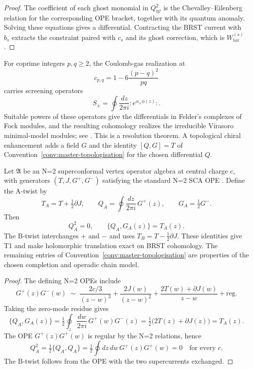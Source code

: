 \begin{proof}
The coefficient of each ghost monomial in $Q_{\mathcal W}^2$ is the
Chevalley--Eilenberg relation for the corresponding OPE bracket,
together with its quantum anomaly.  Solving these equations gives a
differential.  Contracting the BRST current with $b_s$ extracts the
constraint paired with $c_s$ and its ghost correction, which is
$W^{(s)}_{\mathrm{tot}}$.
\end{proof}

\begin{corollary}
\label{cor:master-screening-brst-c-lt-minus-1}
For coprime integers $p,q\geq2$, the Coulomb-gas realization at
\[
 c_{p,q}=1-6\frac{(p-q)^2}{pq}
\]
carries screening operators
\[
 S_\pm=\oint\frac{dz}{2\pi i}
 {:}e^{\alpha_\pm\phi(z)}{:}.
\]
Suitable powers of these operators give the differentials in Felder's
complexes of Fock modules, and the resulting cohomology realizes the
irreducible Virasoro minimal-model modules; see
\cite[\S15]{FrenkelBenZvi}.  This is a resolution theorem.  A
topological chiral enhancement adds a field $G$ and the identity
$[Q,G]=T$ of Convention~\ref{conv:master-topologisation} for the
chosen differential $Q$.
\end{corollary}

\begin{theorem}[$N=2$ topological-twist identities;
$\ClaimStatusProvedElsewhere$]
\label{thm:master-n2-topological-twist-topologisation}
Let $\mathfrak A$ be an N=2 superconformal vertex operator algebra at
central charge $c$, with generators
$(T, J, G^+, G^-)$ satisfying the standard N=2 SCA OPE
\cite[Chapter~5]{FrenkelBenZvi}.  Define the A-twist by
\[
T_A = T + \tfrac{1}{2}\partial J,
\qquad
Q_A = \oint \frac{dz}{2\pi i}\, G^+(z),
\qquad
G_A = \tfrac{1}{2}G^-.
\]
Then
\[
Q_A^2=0,
\qquad
\{Q_A,G_A(z)\}=T_A(z).
\]
The B-twist interchanges $+$ and $-$ and uses
$T_B=T-\frac12\partial J$.  These identities give T1 and make
holomorphic translation exact on BRST cohomology.  The remaining
entries of Convention~\ref{conv:master-topologisation} are properties
of the chosen completion and operadic chain model.
\end{theorem}

\begin{proof}
The defining N=2 OPEs include
\[
G^+(z) G^-(w) \;\sim\; \frac{2c/3}{(z-w)^3} + \frac{2 J(w)}{(z-w)^2}
 + \frac{2T(w) + \partial J(w)}{z - w} + \mathrm{reg}.
\]
Taking the zero-mode residue gives
\[
\{Q_A, G_A(z)\}
 = \tfrac{1}{2} \oint_z \frac{dw}{2\pi i}\, G^+(w) G^-(z)
 = \tfrac{1}{2}\bigl(2T(z) + \partial J(z)\bigr)
 = T_A(z).
\]
The OPE $G^+(z)G^+(w)$ is regular by the N=2 relations, hence
\[
Q_A^2 = \tfrac{1}{2}\{Q_A, Q_A\}
 = \tfrac{1}{2}\oint dz\, dw\, G^+(z) G^+(w) = 0
 \quad \text{for every } c.
\]
The B-twist follows from the OPE with the two supercurrents exchanged.
\end{proof}


